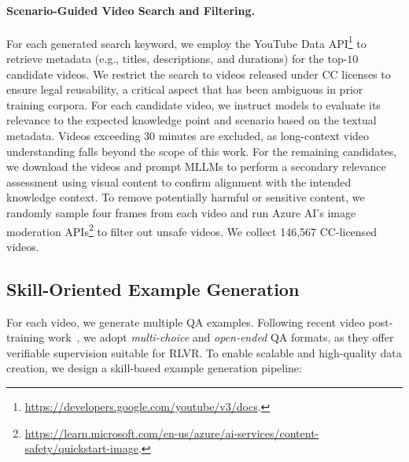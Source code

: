 \documentclass{llmxive}
\providecommand{\eg}{e.g.,\xspace}
\begin{document}
\vspace{-8pt}
\paragraph{Scenario-Guided Video Search and Filtering.}
For each generated search keyword, we employ the YouTube Data API\footnote{\href{https://developers.google.com/youtube/v3/docs}{https://developers.google.com/youtube/v3/docs}.} to retrieve metadata (\eg titles, descriptions, and durations) for the top-$10$ candidate videos. 
We restrict the search to videos released under CC licenses to ensure legal reusability,
a critical aspect that has been ambiguous in prior training corpora. 
For each candidate video, we instruct models to evaluate its relevance to the expected knowledge point and scenario based on the textual metadata. 
Videos exceeding 30 minutes are excluded, as long-context video understanding falls beyond the scope of this work. 
For the remaining candidates, we download the videos and prompt MLLMs to perform a secondary relevance assessment using visual content to confirm alignment with the intended knowledge context.
To remove potentially harmful or sensitive content, we randomly sample four frames from each video and run Azure AI's image moderation APIs\footnote{\href{https://learn.microsoft.com/azure/ai-services/content-safety/quickstart-image}{https://learn.microsoft.com/en-us/azure/ai-services/content-safety/quickstart-image}.} to filter out unsafe videos.
We collect 146,567 CC-licensed videos.


\subsection{Skill-Oriented Example Generation}\label{sec:3.3}
For each video,
we generate multiple QA examples.
Following recent video post-training work~\cite{videor1, Open-o3}, we adopt \emph{multi-choice} and \emph{open-ended} QA formats, as they offer verifiable supervision suitable for RLVR. To enable scalable and high-quality data creation, we design a skill-based example generation pipeline:

\vspace{-8pt}
\end{document}
